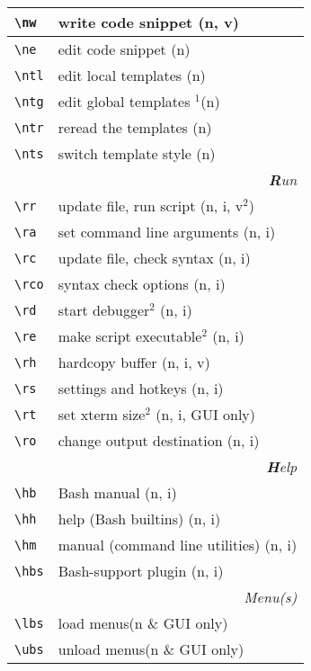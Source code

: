 \documentclass[oneside,11pt,a4paper,DIV18]{scrartcl}
\begin{document}
\begin{center}
\begin{tabular}[]{|p{11mm}|p{59mm}|}
\hline \verb'\nw'  & write code snippet         \hfill (n, v)\\
\hline \verb'\ne'  & edit code snippet          \hfill (n)\\
%
\hline \verb'\ntl' & edit local templates      \hfill (n)\\
\hline \verb'\ntg' & edit global templates $^1$\hfill (n)\\
\hline \verb'\ntr' & reread the templates      \hfill (n)\\
\hline \verb'\nts' & switch template style     \hfill (n)\\
\hline
\hline
\multicolumn{2}{|r|}{\textsl{\textbf{R}un}}\\
\hline \verb'\rr'  & update file, run script        \hfill (n, i, v$^2$)\\
\hline \verb'\ra'  & set command line arguments     \hfill (n, i)\\
\hline \verb'\rc'  & update file, check syntax      \hfill (n, i)\\
\hline \verb'\rco' & syntax check options           \hfill (n, i)\\
\hline \verb'\rd'  & start debugger$^2$             \hfill (n, i)\\
\hline \verb'\re'  & make script executable$^2$     \hfill (n, i)\\
\hline \verb'\rh'  & hardcopy buffer                \hfill (n, i, v)\\
\hline \verb'\rs'  & settings and hotkeys           \hfill (n, i)\\
\hline \verb'\rt'  & set xterm size$^2$             \hfill (n, i, GUI only)\\
\hline \verb'\ro'  & change output destination      \hfill (n, i)\\
\hline
\hline 
\multicolumn{2}{|r|}{\textsl{\textbf{H}elp}}\\
\hline \verb'\hb'  & Bash manual                     \hfill (n, i)\\
\hline \verb'\hh'  & help (Bash builtins)            \hfill (n, i)\\
\hline \verb'\hm'  & manual (command line utilities) \hfill (n, i)\\
\hline \verb'\hbs' & Bash-support plugin             \hfill (n, i)\\
\hline 
\hline
\multicolumn{2}{|r|}{\textsl{Menu(s)}}\\
\hline \verb'\lbs'  & load    menus\hfill \scriptsize{(n \& GUI only)}\\
\hline \verb'\ubs'  & unload  menus\hfill \scriptsize{(n \& GUI only)}\\

\end{tabular}
\end{center}
\end{document}
